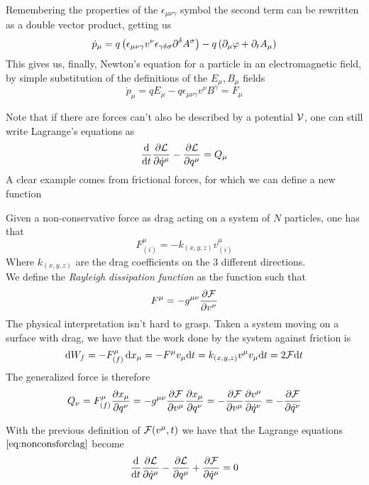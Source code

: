 \documentclass[../admech.tex]{subfiles}
\begin{document}
\begin{eg}
\begin{equation}
		\label{eq:lageq}
	\end{equation}
	Remembering the properties of the $\epsilon_{\mu\nu\gamma}$ symbol the second term can be rewritten as a double vector product, getting us
	\begin{equation*}
		\dot{p}_\mu=q\left( \epsilon_{\mu\nu\gamma}v^\nu\epsilon_{\gamma\delta\sigma}\partial^\delta A^\sigma \right)-q\left( \partial_\mu\varphi+\partial_tA_\mu \right)
	\end{equation*}
	This gives us, finally, Newton's equation for a particle in an electromagnetic field, by simple substitution of the definitions of the $E_\mu,B_\mu$ fields
	\begin{equation*}
		\dot{p}_\mu=qE_\mu-q\epsilon_{\mu\nu\gamma}v^\nu B^\gamma=F_\mu
	\end{equation*}
\end{eg}
Note that if there are forces can't also be described by a potential $\mathcal{V}$, one can still write Lagrange's equations as
\begin{equation}
	\dv{t}\pdv{\mathcal{L}}{\dot{q}^\mu}-\pdv{\mathcal{L}}{q^\mu}=Q_\mu
	\label{eq:nonconsforclag}
\end{equation}
A clear example comes from frictional forces, for which we can define a new function
\begin{dfn}
	Given a non-conservative force as drag acting on a system of $N$ particles, one has that
	\begin{equation*}
		F^\mu_{(i)}=-k_{(x,y,z)}v^\mu_{(i)}
	\end{equation*}
	Where $k_{(x,y,z)}$ are the drag coefficients on the 3 different directions.\\
	We define the \emph{Rayleigh dissipation function} as the function such that
	\begin{equation*}
		F^\mu=-g^{\mu\nu}\pdv{\mathcal{F}}{v^\nu}
	\end{equation*}
	The physical interpretation isn't hard to grasp. Taken a system moving on a surface with drag, we have that the work done by the system against friction is
	\begin{equation*}
		\dd W_f=-F^\mu_{(f)}\dd{x_\mu}=-F^\mu v_\mu\dd t=k_{(x,y,z)}v^\mu v_\mu\dd t=2\mathcal{F}\dd t
	\end{equation*}
	The generalized force is therefore
	\begin{equation*}
		Q_\nu=F^\mu_{(f)}\pdv{x_\mu}{q^\nu}=-g^{\mu\nu}\pdv{\mathcal{F}}{v^\mu}\pdv{x_\mu}{q^\nu}=-\pdv{\mathcal{F}}{v^\mu}\pdv{v^\mu}{\dot{q}^\nu}=-\pdv{\mathcal{F}}{\dot{q}^\nu}
	\end{equation*}
\end{dfn}
With the previous definition of $\mathcal{F}(v^\mu,t)$ we have that the Lagrange equations $\eqref{eq:nonconsforclag}$ become
\begin{equation}
	\dv{t}\pdv{\mathcal{L}}{\dot{q}^\mu}-\pdv{\mathcal{L}}{q^\mu}+\pdv{\mathcal{F}}{\dot{q}^\mu}=0
	\label{eq:raylageq}
\end{equation}
\end{document}
